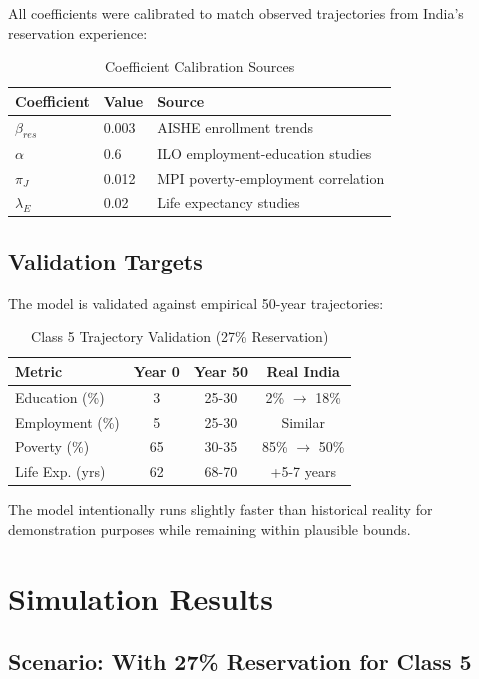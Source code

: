 \documentclass[10pt,twocolumn]{article}
\begin{document}
All coefficients were calibrated to match observed trajectories from India's reservation experience:

\begin{table}[H]
\centering
\caption{Coefficient Calibration Sources}
\begin{tabular}{lll}
\toprule
\textbf{Coefficient} & \textbf{Value} & \textbf{Source} \\
\midrule
$\beta_{res}$ & 0.003 & AISHE enrollment trends \\
$\alpha$ & 0.6 & ILO employment-education studies \\
$\pi_J$ & 0.012 & MPI poverty-employment correlation \\
$\lambda_E$ & 0.02 & Life expectancy studies \cite{life_exp_caste} \\
\bottomrule
\end{tabular}
\end{table}

\subsection{Validation Targets}

The model is validated against empirical 50-year trajectories:

\begin{table}[H]
\centering
\caption{Class 5 Trajectory Validation (27\% Reservation)}
\begin{tabular}{lccc}
\toprule
\textbf{Metric} & \textbf{Year 0} & \textbf{Year 50} & \textbf{Real India} \\
\midrule
Education (\%) & 3 & 25-30 & 2\% $\rightarrow$ 18\% \\
Employment (\%) & 5 & 25-30 & Similar \\
Poverty (\%) & 65 & 30-35 & 85\% $\rightarrow$ 50\% \\
Life Exp. (yrs) & 62 & 68-70 & +5-7 years \\
\bottomrule
\end{tabular}
\end{table}

The model intentionally runs slightly faster than historical reality for demonstration purposes while remaining within plausible bounds.

\section{Simulation Results}

\subsection{Scenario: With 27\% Reservation for Class 5}
\end{document}
